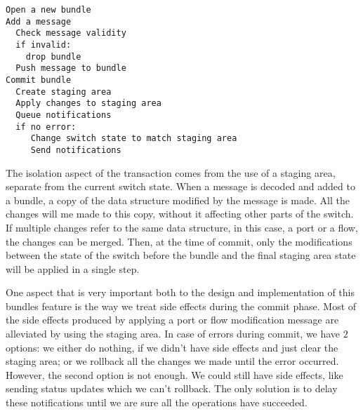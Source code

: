 \pagebreak
\begin{lstlisting}[caption={Basic Commit Algorithm}, label=code:alg]
Open a new bundle
Add a message
  Check message validity
  if invalid:
    drop bundle
  Push message to bundle
Commit bundle
  Create staging area
  Apply changes to staging area
  Queue notifications
  if no error:
     Change switch state to match staging area
     Send notifications
\end{lstlisting}

The isolation aspect of the transaction comes from the use of a staging area, separate from the current switch state.
When a message is decoded and added to a bundle, a copy of the data structure modified by the message is made.
All the changes will me made to this copy, without it affecting other parts of the switch. If multiple changes refer to
the same data structure, in this case, a port or a flow, the changes can be merged. Then, at the time of commit, only
the modifications between the state of the switch before the bundle and the final staging area state will be applied
in a single step.

One aspect that is very important both to the design and implementation of this bundles feature is the way we
treat side effects during the commit phase. Most of the side effects produced by applying a port or flow modification
message are alleviated by using the staging area. In case of errors during commit, we have $2$ options: we either do
nothing, if we didn't have side effects and just clear the staging area; or we rollback all the changes we made until
the error occurred. However, the second option is not enough. We could still have side effects, like sending status updates
which we can't rollback. The only solution is to delay these notifications until we are sure all the operations have
succeeded.




